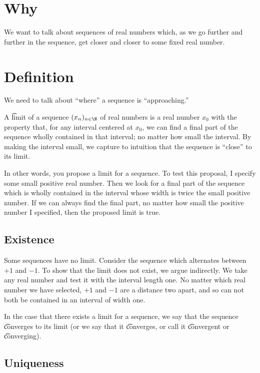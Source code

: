 
\section*{Why}

We want to talk about sequences of real numbers which, as we go further and further in the sequence, get closer and closer to some fixed real number.

\section*{Definition}

We need to talk about ``where'' a sequence is ``approaching.''

A \t{limit} of a sequence $(x_n)_{n \in \N  }$ of real numbers is a real number $x_0$ with the property that, for any interval centered at $x_0$, we can find a final part of the sequence wholly contained in that interval; no matter how small the interval.
By making the interval small, we capture to intuition that the sequence is ``close'' to its limit.

In other words, you propose a limit for a sequence.
To test this proposal, I specify some small positive real number.
Then we look for a final part of the sequence which is wholly contained in the interval whose width is twice the small positive number.
If we can always find the final part, no matter how small the positive number I specified, then the proposed limit is true.

\subsection*{Existence}

Some sequences have no limit.
Consider the sequence which alternates between $+1$ and $-1$.
To show that the limit does not exist, we argue indirectly.
We take any real number and test it with the interval length one.
No matter which real number we have selected, $+1$ and $-1$ are a distance two apart, and so can not both be contained in an interval of width one.

In the case that there exists a limit for a sequence, we say that the sequence \t{converges to} its limit (or we say that it \t{converges}, or call it \t{convergent} or \t{converging}).

\subsection*{Uniqueness}

